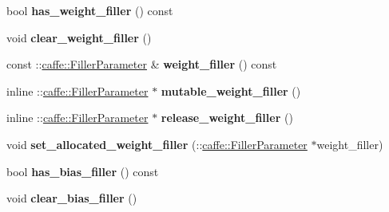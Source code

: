 \begin{DoxyCompactItemize}
\mbox{\label{classcaffe_1_1_convolution_parameter_a682539a12157a67f6bebdedb99a78f3c}} 
bool {\bfseries has\+\_\+weight\+\_\+filler} () const
\item 
\mbox{\label{classcaffe_1_1_convolution_parameter_abb6ddd02f35c8c51118cc3dac67b9935}} 
void {\bfseries clear\+\_\+weight\+\_\+filler} ()
\item 
\mbox{\label{classcaffe_1_1_convolution_parameter_a96dd188bde5d237f5b626dc21c1ea314}} 
const \+::\mbox{\hyperlink{classcaffe_1_1_filler_parameter}{caffe\+::\+Filler\+Parameter}} \& {\bfseries weight\+\_\+filler} () const
\item 
\mbox{\label{classcaffe_1_1_convolution_parameter_a9cd0af60208bd382ab7fc1ba42e70212}} 
inline \+::\mbox{\hyperlink{classcaffe_1_1_filler_parameter}{caffe\+::\+Filler\+Parameter}} $\ast$ {\bfseries mutable\+\_\+weight\+\_\+filler} ()
\item 
\mbox{\label{classcaffe_1_1_convolution_parameter_a2304eccc2e0b8762d71673ee040d7405}} 
inline \+::\mbox{\hyperlink{classcaffe_1_1_filler_parameter}{caffe\+::\+Filler\+Parameter}} $\ast$ {\bfseries release\+\_\+weight\+\_\+filler} ()
\item 
\mbox{\label{classcaffe_1_1_convolution_parameter_aa85d58a9ca79b2e82b5bd5c7fce51992}} 
void {\bfseries set\+\_\+allocated\+\_\+weight\+\_\+filler} (\+::\mbox{\hyperlink{classcaffe_1_1_filler_parameter}{caffe\+::\+Filler\+Parameter}} $\ast$weight\+\_\+filler)
\item 
\mbox{\label{classcaffe_1_1_convolution_parameter_acc290f632ab0ce1e9629444754573803}} 
bool {\bfseries has\+\_\+bias\+\_\+filler} () const
\item 
\mbox{\label{classcaffe_1_1_convolution_parameter_ac60ca294a7d9cd8d270e5b4dfd43916b}} 
void {\bfseries clear\+\_\+bias\+\_\+filler} ()
\item 
\mbox{\label{classcaffe_1_1_convolution_parameter_a96109bceedddd16df77661a3dc464ed4}} 

\end{DoxyCompactItemize}
